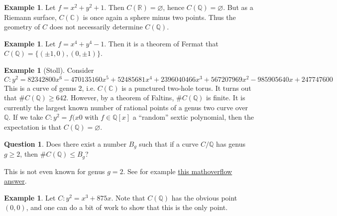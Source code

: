 \documentclass{article}
\theoremstyle{definition}
\newtheorem{example}[subsection]{Example}
\newtheorem{question}[subsection]{Question}
\begin{document}
\begin{example}
Let $f=x^2+y^2+1$. Then $C(\mathbb{R})=\varnothing$, hence 
$C(\mathbb{Q})=\varnothing$. But as a Riemann surface, $C(\mathbb{C})$ is 
once again a sphere minus two points. Thus the geometry of $C$ does not 
necessarily determine $C(\mathbb{Q})$. 
\end{example}

\begin{example}
Let $f=x^4+y^4-1$. Then it is a theorem of Fermat that 
$C(\mathbb{Q})=\{(\pm 1,0),(0,\pm 1)\}$.
\end{example}

\begin{example}[Stoll]
Consider 
\[
  C : y^2=82342800 x^6 - 470135160 x^5 + 52485681 x^4 + 2396040466 x^3 + 567207969 x^2 - 985905640 x + 247747600
\]
This is a curve of genus 2, i.e. $C(\mathbb{C})$ is a punctured two-hole 
torus. It turns out that $\# C(\mathbb{Q})\geqslant 642$. However, by a 
theorem of Faltins, $\# C(\mathbb{Q})$ is finite. It is currently the 
largest known number of rational points of a genus two curve over 
$\mathbb{Q}$. If we take $C:y^2=f(x0$ with $f\in\mathbb{Q}[x]$ a ``random'' 
sextic polynomial, then the expectation is that $C(\mathbb{Q})=\varnothing$. 
\end{example}

\begin{question}
Does there exist a number $B_g$ such that if a curve $C/\mathbb{Q}$ has 
genus $g\geqslant 2$, then $\# C(\mathbb{Q})\leqslant B_g$?
\end{question}

This is not even known for genus $g=2$. See for example \href{http://mathoverflow.net/questions/103327/what-is-the-maximum-number-of-rational-points-of-a-curve-of-genus-2-over-the-rat}{this mathoverflow answer}. 

\begin{example}
Let $C:y^2=x^3+875 x$. Note that $C(\mathbb{Q})$ has the obvious point 
$(0,0)$, and one can do a bit of work to show that this is the only point. 
\end{example}
\end{document}
